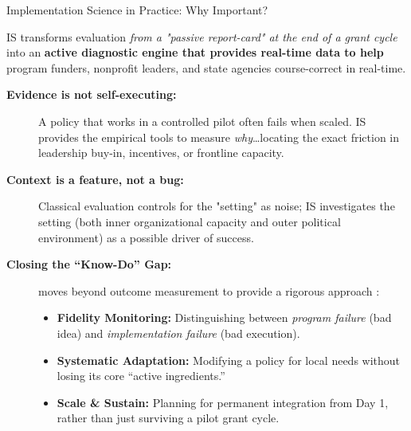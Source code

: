 \documentclass[aspectratio=169, 10pt]{beamer}
\begin{document}
\begin{frame}[fragile]{Implementation Science in Practice: Why Important?}

{} IS transforms evaluation \textit{from a "passive report-card" at the end of a grant cycle} into an \textbf{active diagnostic engine that provides real-time data to help} program funders, nonprofit leaders, and state agencies course-correct in real-time.\\ \pause
\hrulefill
\vfill
\footnotesize
\begin{description}
    \item[\textbf{\textcolor{TXBlue}{Evidence is not self-executing:}}]A policy that works in a controlled pilot often fails when scaled. IS provides the empirical tools to measure \textit{why}\ldots locating the exact friction in leadership buy-in, incentives, or frontline capacity.    
    \item[\textbf{\textcolor{TXBlue}{Context is a feature, not a bug:}}]Classical evaluation controls for the "setting" as noise; IS investigates the setting (both inner organizational capacity and outer political environment) as a possible driver of success.    
    \item[\textbf{\textcolor{TXBlue}{Closing the ``Know-Do'' Gap:}}] moves beyond outcome measurement to provide a rigorous approach : \pause
    \begin{itemize}
        \item \textbf{Fidelity Monitoring:} Distinguishing between \textit{program failure} (bad idea) and \textit{implementation failure} (bad execution).
        \item \textbf{Systematic Adaptation:} Modifying a policy for local needs without losing its core ``active ingredients.''
        \item \textbf{{Scale \& Sustain:}} Planning for permanent integration from Day 1, rather than just surviving a pilot grant cycle.
    \end{itemize}
 \end{description}

\end{frame}
\end{document}
